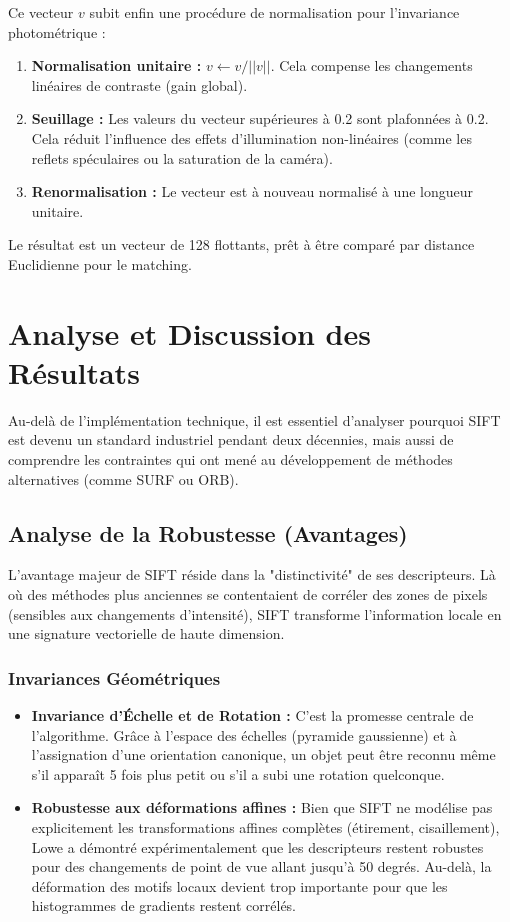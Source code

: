 \documentclass[a4paper,12pt]{report}
\begin{document}
Ce vecteur $v$ subit enfin une procédure de normalisation pour l'invariance photométrique :
\begin{enumerate}
    \item \textbf{Normalisation unitaire :} $v \leftarrow v / ||v||$. Cela compense les changements linéaires de contraste (gain global).
    \item \textbf{Seuillage :} Les valeurs du vecteur supérieures à 0.2 sont plafonnées à 0.2. Cela réduit l'influence des effets d'illumination non-linéaires (comme les reflets spéculaires ou la saturation de la caméra).
    \item \textbf{Renormalisation :} Le vecteur est à nouveau normalisé à une longueur unitaire.
\end{enumerate}

Le résultat est un vecteur de 128 flottants, prêt à être comparé par distance Euclidienne pour le matching.

\chapter{Analyse et Discussion des Résultats}

Au-delà de l'implémentation technique, il est essentiel d'analyser pourquoi SIFT est devenu un standard industriel pendant deux décennies, mais aussi de comprendre les contraintes qui ont mené au développement de méthodes alternatives (comme SURF ou ORB).

\section{Analyse de la Robustesse (Avantages)}

L'avantage majeur de SIFT réside dans la "distinctivité" de ses descripteurs. Là où des méthodes plus anciennes se contentaient de corréler des zones de pixels (sensibles aux changements d'intensité), SIFT transforme l'information locale en une signature vectorielle de haute dimension.

\subsection{Invariances Géométriques}
\begin{itemize}
    \item \textbf{Invariance d'Échelle et de Rotation :} C'est la promesse centrale de l'algorithme. Grâce à l'espace des échelles (pyramide gaussienne) et à l'assignation d'une orientation canonique, un objet peut être reconnu même s'il apparaît 5 fois plus petit ou s'il a subi une rotation quelconque.
    \item \textbf{Robustesse aux déformations affines :} Bien que SIFT ne modélise pas explicitement les transformations affines complètes (étirement, cisaillement), Lowe a démontré expérimentalement que les descripteurs restent robustes pour des changements de point de vue allant jusqu'à 50 degrés. Au-delà, la déformation des motifs locaux devient trop importante pour que les histogrammes de gradients restent corrélés.
\end{itemize}
\end{document}
